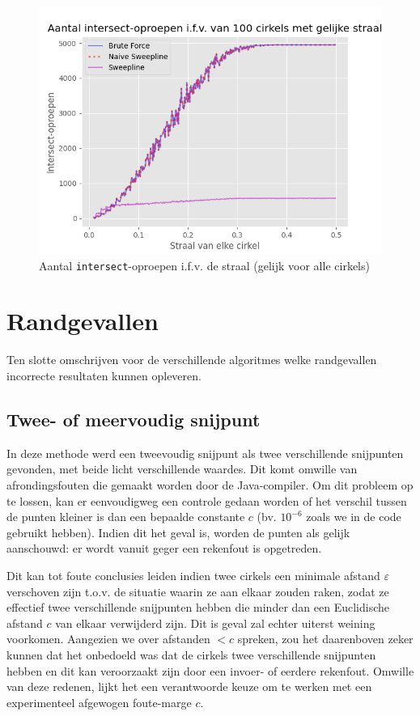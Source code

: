\documentclass[12pt]{article}
\begin{document}
\begin{figure}
	\centering
	\includegraphics[width=\linewidth]{../plots/ToenemendeStraal.png}
	\caption{Aantal \texttt{intersect}-oproepen i.f.v. de straal (gelijk voor alle cirkels)}
	\label{fig:stralen}
\end{figure}

\section{Randgevallen}
Ten slotte omschrijven voor de verschillende algoritmes welke randgevallen incorrecte resultaten kunnen opleveren.

\subsection{Twee- of meervoudig snijpunt}
In deze methode werd een tweevoudig snijpunt als twee verschillende snijpunten gevonden, met beide licht verschillende waardes. Dit komt omwille van afrondingsfouten die gemaakt worden door de Java-compiler. Om dit probleem op te lossen, kan er eenvoudigweg een controle gedaan worden of het verschil tussen de punten kleiner is dan een bepaalde constante $c$ (bv. $10^{-6}$ zoals we in de code gebruikt hebben). Indien dit het geval is, worden de punten als gelijk aanschouwd: er wordt vanuit geger een rekenfout is opgetreden. 

Dit kan tot foute conclusies leiden indien twee cirkels een minimale afstand $\varepsilon$ verschoven zijn t.o.v. de situatie waarin ze aan elkaar zouden raken, zodat ze effectief twee verschillende snijpunten hebben die minder dan een Euclidische afstand $c$ van elkaar verwijderd zijn. Dit is geval zal echter uiterst weining voorkomen. Aangezien we over afstanden $< c$ spreken, zou het daarenboven zeker kunnen dat het onbedoeld was dat de cirkels twee verschillende snijpunten hebben en dit kan veroorzaakt zijn door een invoer- of eerdere rekenfout. Omwille van deze redenen, lijkt het een verantwoorde keuze om te werken met een experimenteel afgewogen foute-marge $c$.
\end{document}
